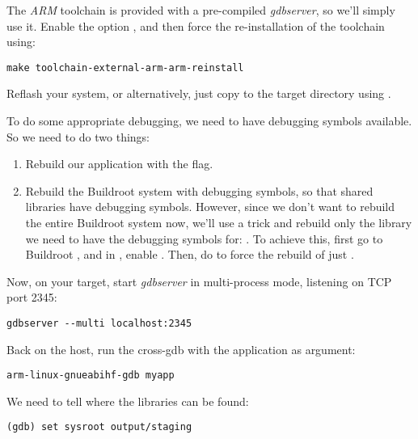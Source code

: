 The {\em ARM} toolchain is provided with a pre-compiled {\em
  gdbserver}, so we'll simply use it. Enable the option
, and then force the
re-installation of the toolchain using:

\begin{verbatim}
make toolchain-external-arm-arm-reinstall
\end{verbatim}

Reflash your system, or alternatively, just copy
 to the target 
directory using .

To do some appropriate debugging, we need to have debugging symbols
available. So we need to do two things:

\begin{enumerate}

\item Rebuild our application with the  flag.

\item Rebuild the Buildroot system with debugging symbols, so that
  shared libraries have debugging symbols. However, since we don't
  want to rebuild the entire Buildroot system now, we'll use a trick
  and rebuild only the library we need to have the debugging symbols
  for: . To achieve this, first go to Buildroot
  , and in , enable
  . Then, do  to force the rebuild of just
  .

\end{enumerate}

Now, on your target, start {\em gdbserver} in multi-process mode,
listening on TCP port 2345:

\begin{verbatim}
gdbserver --multi localhost:2345
\end{verbatim}

Back on the host, run the cross-gdb with the  application
as argument:

\begin{verbatim}
arm-linux-gnueabihf-gdb myapp
\end{verbatim}

We need to tell  where the libraries can be found:

\begin{verbatim}
(gdb) set sysroot output/staging
\end{verbatim}

